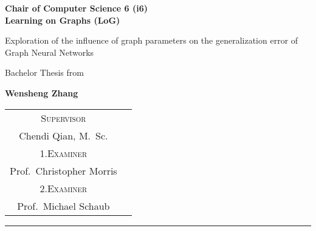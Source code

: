 \begin{titlepage}
    \centering
    \begin{onehalfspace}
    	\begin{german}
        	\vspace{1.0cm}
        	\large {\bfseries Chair of Computer Science 6 (i6)\\Learning on Graphs (LoG)} \\

        	\vspace{2.5cm}

            \begin{doublespace}
            	\textenglish{\textsf{\Huge{Exploration of the influence of graph parameters on the generalization error of Graph Neural Networks}}}
            \end{doublespace}

        	\vspace{2cm}

            \Large{Bachelor Thesis from}\\

        	\vspace{1cm}

        	{\bfseries \large{Wensheng Zhang}}

        	\vfill

        	{\large
        		\begin{tabular}[l]{cc}
                        \textsc{Supervisor}\\
        			Chendi Qian, M.~Sc. \\
        			\textsc{1.Examiner}\\
        			Prof.~Christopher Morris \\
                        \textsc{2.Examiner}\\
        			Prof.~Michael Schaub
        		\end{tabular}
        	}

        	\vspace{1.5cm}

        	\parbox{\linewidth}{\hrule\strut}

            \vfill

	    \textgerman{\thedate}
    	\end{german}
    \end{onehalfspace}
\end{titlepage}
